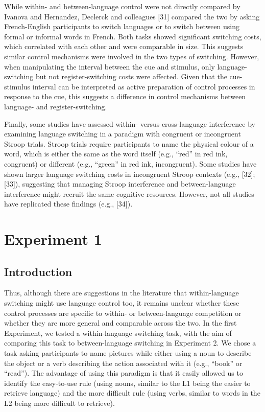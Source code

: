 \documentclass[
]{article}
\begin{document}
While within- and between-language control were not directly compared by Ivanova and Hernandez, Declerck and colleagues {[}31{]} compared the two by asking French-English participants to switch languages or to switch between using formal or informal words in French. Both tasks showed significant switching costs, which correlated with each other and were comparable in size. This suggests similar control mechanisms were involved in the two types of switching. However, when manipulating the interval between the cue and stimulus, only language-switching but not register-switching costs were affected. Given that the cue-stimulus interval can be interpreted as active preparation of control processes in response to the cue, this suggests a difference in control mechanisms between language- and register-switching.

Finally, some studies have assessed within- versus cross-language interference by examining language switching in a paradigm with congruent or incongruent Stroop trials. Stroop trials require participants to name the physical colour of a word, which is either the same as the word itself (e.g., ``red'' in red ink, congruent) or different (e.g., ``green'' in red ink, incongruent). Some studies have shown larger language switching costs in incongruent Stroop contexts (e.g., {[}32{]};{[}33{]}), suggesting that managing Stroop interference and between-language interference might recruit the same cognitive resources. However, not all studies have replicated these findings (e.g., {[}34{]}).

\hypertarget{experiment-1}{%
\section{Experiment 1}\label{experiment-1}}

\hypertarget{introduction-1}{%
\subsection{Introduction}\label{introduction-1}}

Thus, although there are suggestions in the literature that within-language switching might use language control too, it remains unclear whether these control processes are specific to within- or between-language competition or whether they are more general and comparable across the two. In the first Experiment, we tested a within-language switching task, with the aim of comparing this task to between-language switching in Experiment 2. We chose a task asking participants to name pictures while either using a noun to describe the object or a verb describing the action associated with it (e.g., ``book'' or ``read''). The advantage of using this paradigm is that it easily allowed us to identify the easy-to-use rule (using nouns, similar to the L1 being the easier to retrieve language) and the more difficult rule (using verbs, similar to words in the L2 being more difficult to retrieve).
\end{document}
